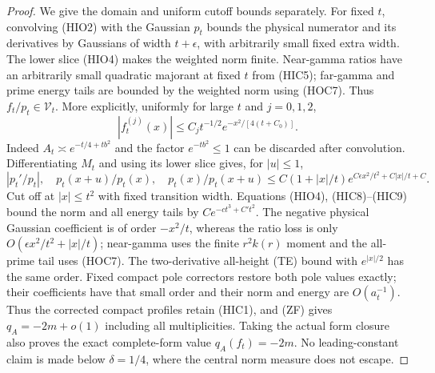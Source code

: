 \documentclass[11pt]{article}
\theoremstyle{remark}\newtheorem{remark}[theorem]{Remark}
\begin{document}
\begin{proof}
We give the domain and uniform cutoff bounds separately.
For fixed $t$, convolving (HIO2) with the Gaussian $p_t$ bounds the
physical numerator and its derivatives by Gaussians of width
$t+\epsilon$, with arbitrarily small fixed extra width.
The lower slice (HIO4) makes the weighted norm finite.
Near-gamma ratios have an arbitrarily small quadratic majorant at
fixed $t$ from (HIC5); far-gamma and prime energy tails are bounded
by the weighted norm using (HOC7). Thus $f_t/p_t\in\mathcal V_t$.
More explicitly, uniformly for large $t$ and $j=0,1,2$,
\[
 |f_t^{(j)}(x)|\le C_jt^{-1/2}e^{-x^2/[4(t+C_0)]}.             \tag{HIC8}
\]
Indeed $A_t\asymp e^{-t/4+tb^2}$ and the factor $e^{-tb^2}\le1$
can be discarded after convolution. Differentiating $M_t$ and
using its lower slice gives, for $|u|\le1$,
\[
 |p_t'/p_t|,\quad p_t(x+u)/p_t(x),\quad p_t(x)/p_t(x+u)
 \le C(1+|x|/t)e^{C\epsilon x^2/t^2+C|x|/t+C}.                \tag{HIC9}
\]
Cut off at $|x|\le t^2$ with fixed transition width.
Equations (HIO4), (HIC8)--(HIC9) bound the norm and all energy
tails by $Ce^{-ct^3+C't^2}$. The negative physical Gaussian
coefficient is of order $-x^2/t$, whereas the ratio loss is only
$O(\epsilon x^2/t^2+|x|/t)$; near-gamma uses the finite $r^2k(r)$
moment and the all-prime tail uses (HOC7). The two-derivative
all-height (TE) bound with $e^{|x|/2}$ has the same order.
Fixed compact pole correctors restore both pole values exactly;
their coefficients have that small order and their norm and energy
are $O(a_t^{-1})$. Thus the corrected compact profiles retain
(HIC1), and (ZF) gives $q_A=-2m+o(1)$ including all multiplicities.
Taking the actual form closure also proves the exact complete-form
value $q_A(f_t)=-2m$. No leading-constant claim is made below
$\delta=1/4$, where the central norm measure does not escape.
\end{proof}
\end{document}
